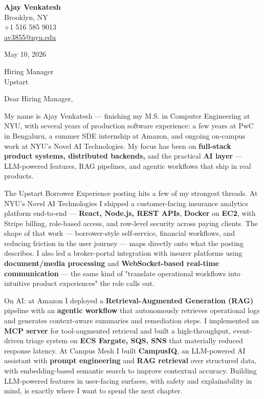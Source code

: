 \documentclass[letterpaper,11pt]{article}
\begin{document}
\begin{flushleft}
\textbf{\large Ajay Venkatesh} \\
Brooklyn, NY \\
+1 516 585 9013 \\
\href{mailto:av3855@nyu.edu}{av3855@nyu.edu}
\end{flushleft}

\vspace{10pt}

May 10, 2026

\vspace{6pt}

Hiring Manager \\
Upstart

\vspace{10pt}

Dear Hiring Manager,

My name is Ajay Venkatesh --- finishing my M.S. in Computer Engineering at NYU, with several years of production software experience: a few years at PwC in Bengaluru, a summer SDE internship at Amazon, and ongoing on-campus work at NYU's Novel AI Technologies. My focus has been on \textbf{full-stack product systems, distributed backends,} and the practical \textbf{AI layer} --- LLM-powered features, RAG pipelines, and agentic workflows that ship in real products.

The Upstart Borrower Experience posting hits a few of my strongest threads. At NYU's Novel AI Technologies I shipped a customer-facing insurance analytics platform end-to-end --- \textbf{React, Node.js, REST APIs}, \textbf{Docker} on \textbf{EC2}, with Stripe billing, role-based access, and row-level security across paying clients. The shape of that work --- borrower-style self-service, financial workflows, and reducing friction in the user journey --- maps directly onto what the posting describes. I also led a broker-portal integration with insurer platforms using \textbf{document/media processing} and \textbf{WebSocket-based real-time communication} --- the same kind of "translate operational workflows into intuitive product experiences" the role calls out.

On AI: at Amazon I deployed a \textbf{Retrieval-Augmented Generation (RAG)} pipeline with an \textbf{agentic workflow} that autonomously retrieves operational logs and generates context-aware summaries and remediation steps. I implemented an \textbf{MCP server} for tool-augmented retrieval and built a high-throughput, event-driven triage system on \textbf{ECS Fargate, SQS, SNS} that materially reduced response latency. At Campus Mesh I built \textbf{CampusIQ}, an LLM-powered AI assistant with \textbf{prompt engineering} and \textbf{RAG retrieval} over structured data, with embedding-based semantic search to improve contextual accuracy. Building LLM-powered features in user-facing surfaces, with safety and explainability in mind, is exactly where I want to spend the next chapter.
\end{document}
